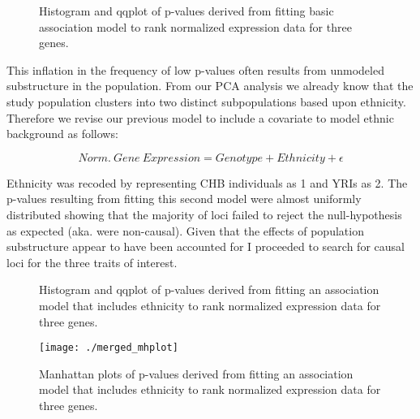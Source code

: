 \documentclass[12pt,a4paper]{article}
\begin{document}
\begin{figure}
\hfill
{}\hfill
{}
\caption{Histogram and qqplot of p-values derived from fitting basic association model to rank normalized expression data for three genes.}
\label{norm_assoc}
\end{figure}   

This inflation in the frequency of low p-values often results from unmodeled substructure in the population. From our PCA analysis we already know that the study population clusters into two distinct subpopulations based upon ethnicity. Therefore we revise our previous model to include a covariate to model ethnic background as follows: 

$$
	Norm.~Gene~Expression = Genotype + Ethnicity +\epsilon
$$

Ethnicity was recoded by representing CHB individuals as 1 and YRIs as 2. The p-values resulting from fitting this second model were almost uniformly distributed showing that the majority of loci failed to reject the null-hypothesis as expected (aka. were non-causal). Given that the effects of population substructure appear to have been accounted for I proceeded to search for causal loci for the three traits of interest. 

\begin{figure}
\hfill
{}\hfill
{}
\caption{Histogram and qqplot of p-values derived from fitting an association model that includes ethnicity to rank normalized expression data for three genes.}
\label{covar_pp}
\end{figure}

\begin{figure}
\caption{Manhattan plots of p-values derived from fitting an association model that includes ethnicity to rank normalized expression data for three genes.}
\label{fig:merged_mhplot}
\texttt{[image: ./merged\_mhplot]}
\end{figure}
\end{document}
